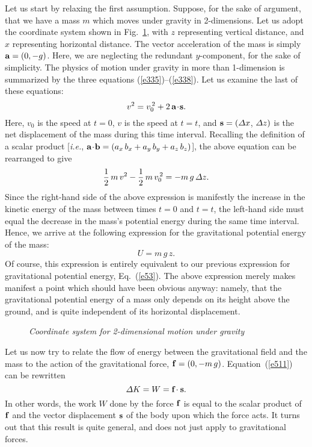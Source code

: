 Let us start by relaxing the first assumption. Suppose, for the sake of argument, that
we have a mass $m$ which moves under gravity in 2-dimensions. Let us adopt
the coordinate system shown in Fig.~\ref{f35}, with $z$ representing vertical
distance, and $x$ representing horizontal distance. The vector
acceleration of the mass is simply ${\bf a}=(0,-g)$. Here, we are neglecting the redundant
$y$-component, for the sake of simplicity. The physics of motion under gravity in more
than 1-dimension is summarized by the three equations (\ref{e335})--(\ref{e338}). Let us examine
the last of these equations:
\begin{equation}
v^2 = v_0^{\,2} + 2\,{\bf a}\!\cdot\!{\bf s}.
\end{equation}
Here, $v_0$ is the speed at $t=0$, $v$ is the speed at $t=t$, and
${\bf s} = ({\mit\Delta}x$, ${\mit\Delta}z)$ is the net displacement of the mass
during this time interval. Recalling the definition of a scalar product 
[{\em i.e.}, ${\bf a}\!\cdot\!{\bf b}= (a_x\,b_x+ a_y\,b_y+a_z\,b_z)$], the above equation
can be rearranged to give
\begin{equation}\label{e511}
\frac{1}{2}\,m\,v^2 - \frac{1}{2}\,m\,v_0^{\,2} = -m\,g\,{\mit\Delta}z.
\end{equation}
Since the right-hand side of the above expression is manifestly the increase in the
kinetic energy of the mass between times $t=0$ and $t=t$, the left-hand side
must equal the decrease in the mass's potential energy during the same time interval. 
Hence, we arrive at the following expression for the gravitational potential energy
of the mass:
\begin{equation}
U = m\,g\,z.
\end{equation}
Of course, this expression is entirely equivalent to our previous expression for
gravitational potential energy, Eq.~(\ref{e53}). The above expression merely
makes manifest a point which should have been obvious anyway: namely, that the
gravitational potential energy of a mass only depends on its height above
the ground, and is quite independent of its horizontal displacement.

\begin{figure}
\epsfysize=1.5in
\centerline{}
\caption{\em Coordinate system for 2-dimensional motion under gravity}\label{f35}   
\end{figure}

Let us now try to relate the flow of energy between the gravitational field and the mass
to the action of the gravitational force, ${\bf f} = (0,-m\,g)$. Equation~(\ref{e511})
can be rewritten
\begin{equation}\label{e514}
{\mit\Delta} K = W = {\bf f}\!\cdot {\bf s}.
\end{equation}
In other words, the work $W$ done by the force ${\bf f}$ is equal to the scalar product
of ${\bf f}$ and the vector displacement ${\bf s}$ of the body upon which the force 
acts. It turns out that this result is quite general, and does not just apply
to gravitational forces. 

